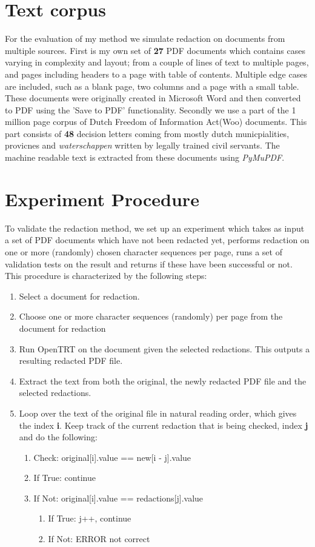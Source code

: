 \section{Text corpus}
For the evaluation of my method we simulate redaction on documents from multiple sources. First is my own set of \textbf{27} PDF documents which contains cases varying in complexity and layout; from a couple of lines of text to multiple pages, and pages including headers to a page with table of contents. Multiple edge cases are included, such as a blank page, two columns and a page with a small table. These documents were originally created in Microsoft Word and then converted to PDF using the 'Save to PDF' functionality. Secondly we use a part of the 1 million page corpus of Dutch Freedom of Information Act(Woo) documents. This part consists of \textbf{48} decision letters coming from mostly dutch municpialities, provicnes and \textit{waterschappen} written  by legally trained civil servants. The machine readable text is extracted from these documents using \textit{PyMuPDF}.

\section{Experiment Procedure}
To validate the redaction method, we set up an experiment which takes as input a set of PDF documents which have not been redacted yet, performs redaction on one or more (randomly) chosen character sequences per page, runs a set of validation tests on the result and returns if these have been successful or not. This procedure is characterized by the following steps:
\begin{enumerate}
    \item Select a document for redaction.
    \item Choose one or more character sequences (randomly) per page from the document for redaction
    \item Run OpenTRT on the document given the selected redactions. This outputs a resulting redacted PDF file.
    \item Extract the text from both the original, the newly redacted PDF file and the selected redactions.
    \item Loop over the text of the original file in natural reading order, which gives the index \textbf{i}. Keep track of the current redaction that is being checked, index \textbf{j} and do the following:
        \begin{enumerate}
            \item Check: original[i].value == new[i - j].value
            \item If True: continue
            \item If Not: original[i].value == redactions[j].value
                \begin{enumerate}
                    \item If True: j++, continue
                    \item If Not: ERROR not correct 
                \end{enumerate}
        \end{enumerate}
\end{enumerate}

